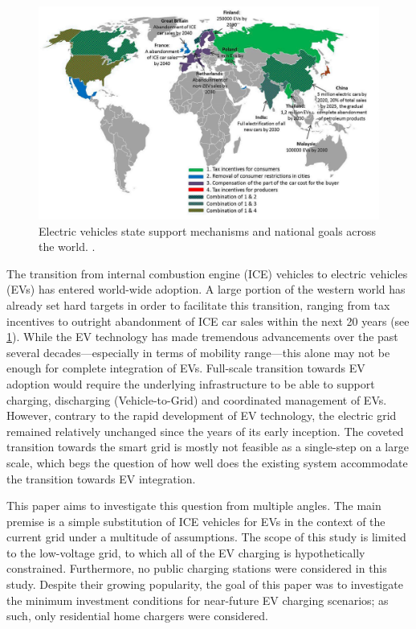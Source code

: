 \documentclass[a4paper,10pt]{report}
\begin{document}
\begin{figure}[htpb]
	\centering
	\includegraphics[width=\linewidth]{ev_state_support_mech}
	\caption[EV state support and goals]{Electric vehicles state support mechanisms and national goals across the world. \cite{Kapustin2020}.}
	\label{ev_state_support_mech}
\end{figure}

The transition from internal combustion engine (ICE) vehicles to electric vehicles (EVs) has entered world-wide adoption. A large portion of the western world has already set hard targets in order to facilitate this transition, ranging from tax incentives to outright abandonment of ICE car sales within the next 20 years (see \cref{ev_state_support_mech}). While the EV technology has made tremendous advancements over the past several decades---especially in terms of mobility range---this alone may not be enough for complete integration of EVs. Full-scale transition towards EV adoption would require the underlying infrastructure to be able to support charging, discharging (Vehicle-to-Grid) and coordinated management of EVs. However, contrary to the rapid development of EV technology, the electric grid remained relatively unchanged since the years of its early inception. The coveted transition towards the smart grid is mostly not feasible as a single-step on a large scale, which begs the question of how well does the existing system accommodate the transition towards EV integration.

This paper aims to investigate this question from multiple angles. The main premise is a simple substitution of ICE vehicles for EVs in the context of the current grid under a multitude of assumptions. The scope of this study is limited to the low-voltage grid, to which all of the EV charging is hypothetically constrained. Furthermore, no public charging stations were considered in this study. Despite their growing popularity, the goal of this paper was to investigate the minimum investment conditions for near-future EV charging scenarios; as such, only residential home chargers were considered.
\end{document}
